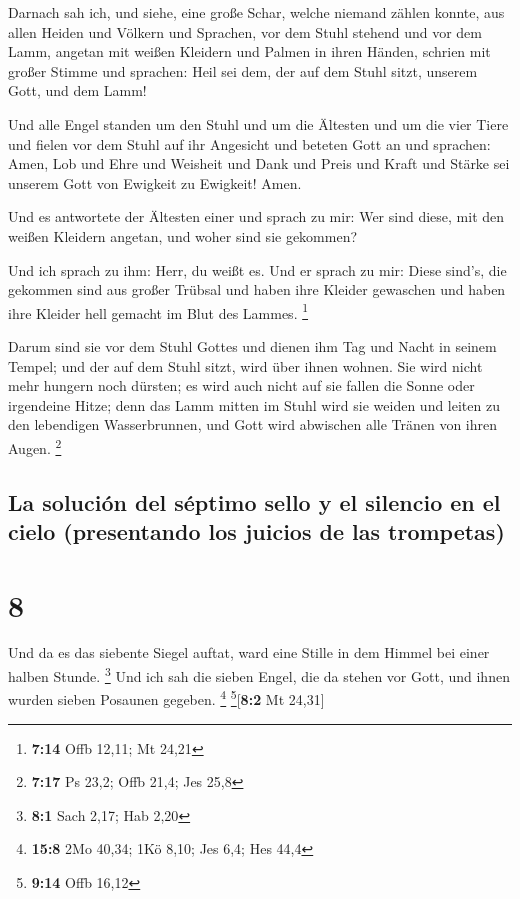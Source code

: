  Darnach sah ich, und siehe, eine große Schar, welche
niemand zählen konnte, aus allen Heiden und Völkern und Sprachen, vor
dem Stuhl stehend und vor dem Lamm, angetan mit weißen Kleidern und
Palmen in ihren Händen,  schrien mit großer Stimme und
sprachen: Heil sei dem, der auf dem Stuhl sitzt, unserem Gott, und dem
Lamm!

 Und alle Engel standen um den Stuhl und um die Ältesten
und um die vier Tiere und fielen vor dem Stuhl auf ihr Angesicht und
beteten Gott an  und sprachen: Amen, Lob und Ehre und
Weisheit und Dank und Preis und Kraft und Stärke sei unserem Gott von
Ewigkeit zu Ewigkeit! Amen.

 Und es antwortete der Ältesten einer und sprach zu mir:
Wer sind diese, mit den weißen Kleidern angetan, und woher sind sie
gekommen?

 Und ich sprach zu ihm: Herr, du weißt es. Und er sprach
zu mir: Diese sind's, die gekommen sind aus großer Trübsal und haben
ihre Kleider gewaschen und haben ihre Kleider hell gemacht im Blut des
Lammes. \footnote{\textbf{7:14} Offb 12,11; Mt 24,21}

 Darum sind sie vor dem Stuhl Gottes und dienen ihm Tag
und Nacht in seinem Tempel; und der auf dem Stuhl sitzt, wird über ihnen
wohnen.  Sie wird nicht mehr hungern noch dürsten; es
wird auch nicht auf sie fallen die Sonne oder irgendeine Hitze;
 denn das Lamm mitten im Stuhl wird sie weiden und leiten
zu den lebendigen Wasserbrunnen, und Gott wird abwischen alle Tränen von
ihren Augen. \footnote{\textbf{7:17} Ps 23,2; Offb 21,4; Jes 25,8}

\hypertarget{la-soluciuxf3n-del-suxe9ptimo-sello-y-el-silencio-en-el-cielo-presentando-los-juicios-de-las-trompetas}{%
\subsection{La solución del séptimo sello y el silencio en el cielo
(presentando los juicios de las
trompetas)}\label{la-soluciuxf3n-del-suxe9ptimo-sello-y-el-silencio-en-el-cielo-presentando-los-juicios-de-las-trompetas}}

\hypertarget{section-7}{%
\section{8}\label{section-7}}

 Und da es das siebente Siegel auftat, ward eine Stille in
dem Himmel bei einer halben Stunde. \footnote{\textbf{8:1} Sach 2,17;
  Hab 2,20}  Und ich sah die sieben Engel, die da stehen
vor Gott, und ihnen wurden sieben Posaunen gegeben. \footnote{\textbf{15:8}
  2Mo 40,34; 1Kö 8,10; Jes 6,4; Hes 44,4} \footnote{\textbf{9:14} Offb
  16,12}{[}\textbf{8:2} Mt 24,31{]}

